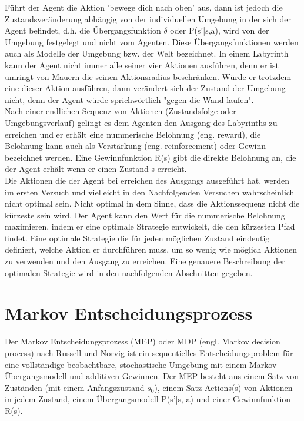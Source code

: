 Führt der Agent die Aktion 'bewege dich nach oben' aus, dann ist jedoch die Zustandsveränderung abhängig von der individuellen Umgebung in der sich der Agent befindet, d.h. die Übergangsfunktion $\delta$ oder P(s'|s,a), wird von der Umgebung festgelegt und nicht vom Agenten. Diese Übergangsfunktionen werden auch als Modelle der Umgebung bzw. der Welt bezeichnet. In einem Labyrinth kann der Agent nicht immer alle seiner vier Aktionen ausführen, denn er ist umringt von Mauern die seinen Aktionsradius beschränken. Würde er trotzdem eine dieser Aktion ausführen, dann verändert sich der Zustand der Umgebung nicht, denn der Agent würde sprichwörtlich "gegen die Wand laufen". \\

Nach einer endlichen Sequenz von Aktionen (Zustandsfolge oder Umgebungsverlauf) gelingt es dem Agenten den Ausgang des Labyrinths zu erreichen und er erhält eine nummerische Belohnung (eng. reward), die Belohnung kann auch als Verstärkung (eng. reinforcement) oder Gewinn bezeichnet werden. Eine Gewinnfunktion R(s) gibt die direkte Belohnung an, die der Agent erhält wenn er einen Zustand s erreicht. \\

Die Aktionen die der Agent bei erreichen des Ausgangs ausgeführt hat, werden im ersten Versuch und vielleicht in den Nachfolgenden Versuchen wahrscheinlich nicht optimal sein. Nicht optimal in dem Sinne, dass die Aktionssequenz nicht die kürzeste sein wird. Der Agent kann den Wert für die nummerische Belohnung maximieren, indem er eine optimale Strategie entwickelt, die den kürzesten Pfad findet. Eine optimale Strategie die für jeden möglichen Zustand eindeutig definiert, welche Aktion er durchführen muss, um so wenig wie möglich Aktionen zu verwenden und den Ausgang zu erreichen. Eine genauere Beschreibung der optimalen Strategie wird in den nachfolgenden Abschnitten gegeben.\\

\section{Markov Entscheidungsprozess}
\label{sec:Markov Entscheidungsprozess}
Der Markov Entscheidungsprozess (MEP) oder MDP (engl. Markov decision process) nach Russell und Norvig \cite[752 \psqq]{Russell} ist ein sequentielles Entscheidungsproblem für eine vollständige beobachtbare, stochastische Umgebung mit einem Markov-Übergangsmodell und additiven Gewinnen. Der MEP besteht aus einem Satz von Zuständen (mit einem Anfangszustand $s_0$), einem Satz Actions(s) von Aktionen in jedem Zustand, einem Übergangsmodell P(s'|s, a) und einer Gewinnfunktion R(s). 

